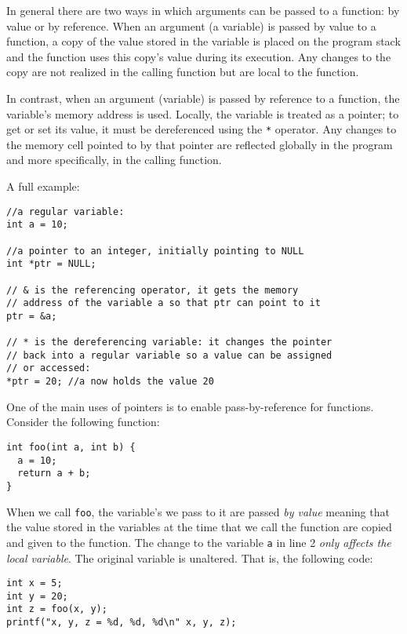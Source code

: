 \documentclass[12pt]{scrartcl}
\begin{document}
In general there are two ways in which arguments can be passed to 
a function: by value or by reference. When an argument (a variable) 
is passed by value to a function, a copy of the value stored in the 
variable is placed on the program stack and the function uses this 
copy's value during its execution.  Any changes to the copy are not 
realized in the calling function but are local to the function.

In contrast, when an argument (variable) is passed by reference to a 
function, the variable's memory address is used.  Locally, the variable 
is treated as a pointer; to get or set its value, it must be dereferenced 
using the \texttt{*} operator.  Any changes to the memory cell pointed to by 
that pointer are reflected globally in the program and more specifically, 
in the calling function.

A full example:

\begin{verbatim}
//a regular variable:
int a = 10; 

//a pointer to an integer, initially pointing to NULL
int *ptr = NULL; 

// & is the referencing operator, it gets the memory 
// address of the variable a so that ptr can point to it
ptr = &a; 

// * is the dereferencing variable: it changes the pointer
// back into a regular variable so a value can be assigned
// or accessed:
*ptr = 20; //a now holds the value 20
\end{verbatim}

One of the main uses of pointers is to enable pass-by-reference 
for functions.  Consider the following function:

\begin{verbatim}
int foo(int a, int b) {
  a = 10;
  return a + b;
}
\end{verbatim}

When we call \texttt{foo}, the variable's we pass to it are passed
\emph{by value} meaning that the value stored in the variables at the
time that we call the function are copied and given to the function.  The
change to the variable \texttt{a} in line 2 \emph{only affects
the local variable}.  The original variable is unaltered.  That is, the following
code:

\begin{verbatim}
int x = 5;
int y = 20;
int z = foo(x, y);
printf("x, y, z = %d, %d, %d\n" x, y, z);
\end{verbatim}
\end{document}
